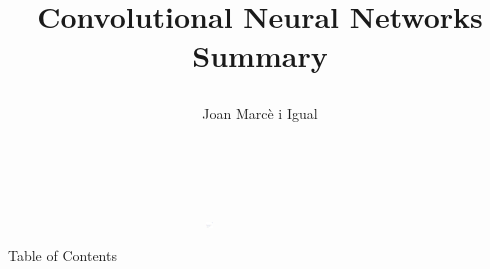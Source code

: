 \documentclass[xcolor={x11names, table}, compress]{beamer}
\begin{document}
{ 
    \begin{frame}
        \vspace{-1.5cm}
        \hfill{}
        \begin{flushleft}
            \hspace{-1cm}\includegraphics[width=0.8\textwidth, height=0.4em]{title_line.pdf}\hfill
            
            \title{
                \begin{flushleft}{\huge \color{BHKpresentationDark} 
                Convolutional Neural Networks Summary
            } 
            \end{flushleft}}
            
            \date{$~~$}
            \author[Joan]{\begin{flushleft}\vspace{-1cm} Joan Marcè i Igual\end{flushleft}}
            \titlepage
        \end{flushleft}
    \end{frame}
}

\begin{frame}{Table of Contents}
	\tableofcontents
\end{frame}

 


\end{document}
